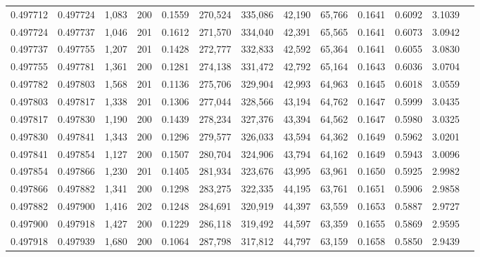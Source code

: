 \begin{tabular}{rrrrrrrrrrrrr}
0.497712 & 0.497724 & 1,083 & 200 &                                     0.1559 & 270,524 & 335,086 &  42,190 &  65,766 & 0.1641 & 0.6092 & 3.1039 \\
0.497724 & 0.497737 & 1,046 & 201 &                                     0.1612 & 271,570 & 334,040 &  42,391 &  65,565 & 0.1641 & 0.6073 & 3.0942 \\
0.497737 & 0.497755 & 1,207 & 201 &                                     0.1428 & 272,777 & 332,833 &  42,592 &  65,364 & 0.1641 & 0.6055 & 3.0830 \\
0.497755 & 0.497781 & 1,361 & 200 &                                     0.1281 & 274,138 & 331,472 &  42,792 &  65,164 & 0.1643 & 0.6036 & 3.0704 \\
0.497782 & 0.497803 & 1,568 & 201 &                                     0.1136 & 275,706 & 329,904 &  42,993 &  64,963 & 0.1645 & 0.6018 & 3.0559 \\
0.497803 & 0.497817 & 1,338 & 201 &                                     0.1306 & 277,044 & 328,566 &  43,194 &  64,762 & 0.1647 & 0.5999 & 3.0435 \\
0.497817 & 0.497830 & 1,190 & 200 &                                     0.1439 & 278,234 & 327,376 &  43,394 &  64,562 & 0.1647 & 0.5980 & 3.0325 \\
0.497830 & 0.497841 & 1,343 & 200 &                                     0.1296 & 279,577 & 326,033 &  43,594 &  64,362 & 0.1649 & 0.5962 & 3.0201 \\
0.497841 & 0.497854 & 1,127 & 200 &                                     0.1507 & 280,704 & 324,906 &  43,794 &  64,162 & 0.1649 & 0.5943 & 3.0096 \\
0.497854 & 0.497866 & 1,230 & 201 &                                     0.1405 & 281,934 & 323,676 &  43,995 &  63,961 & 0.1650 & 0.5925 & 2.9982 \\
0.497866 & 0.497882 & 1,341 & 200 &                                     0.1298 & 283,275 & 322,335 &  44,195 &  63,761 & 0.1651 & 0.5906 & 2.9858 \\
0.497882 & 0.497900 & 1,416 & 202 &                                     0.1248 & 284,691 & 320,919 &  44,397 &  63,559 & 0.1653 & 0.5887 & 2.9727 \\
0.497900 & 0.497918 & 1,427 & 200 &                                     0.1229 & 286,118 & 319,492 &  44,597 &  63,359 & 0.1655 & 0.5869 & 2.9595 \\
0.497918 & 0.497939 & 1,680 & 200 &                                     0.1064 & 287,798 & 317,812 &  44,797 &  63,159 & 0.1658 & 0.5850 & 2.9439 \\

\end{tabular}
